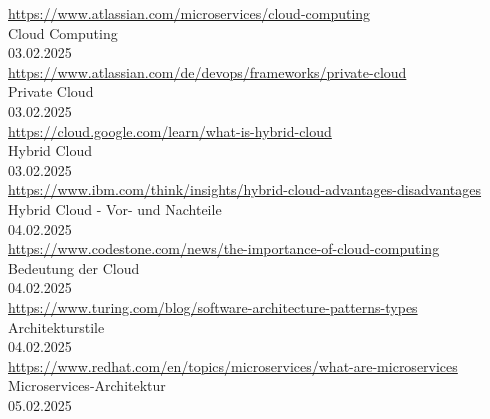 \begin{thebibliography}{999}
     \href{https://www.atlassian.com/microservices/cloud-computing}{https://www.atlassian.com/microservices/cloud-computing} \\
     Cloud Computing \\
     03.02.2025 \\

     \href{https://www.atlassian.com/de/devops/frameworks/private-cloud}{https://www.atlassian.com/de/devops/frameworks/private-cloud} \\
     Private Cloud \\
     03.02.2025 \\

     \href{https://cloud.google.com/learn/what-is-hybrid-cloud}{https://cloud.google.com/learn/what-is-hybrid-cloud} \\
     Hybrid Cloud \\
     03.02.2025 \\

     \href{https://www.ibm.com/think/insights/hybrid-cloud-advantages-disadvantages}{https://www.ibm.com/think/insights/hybrid-cloud-advantages-disadvantages} \\
     Hybrid Cloud - Vor- und Nachteile \\
     04.02.2025 \\

     \href{https://www.codestone.com/news/the-importance-of-cloud-computing}{https://www.codestone.com/news/the-importance-of-cloud-computing} \\
     Bedeutung der Cloud \\
     04.02.2025 \\

     \href{https://www.turing.com/blog/software-architecture-patterns-types}{https://www.turing.com/blog/software-architecture-patterns-types} \\
     Architekturstile \\
     04.02.2025 \\

     \href{https://www.redhat.com/en/topics/microservices/what-are-microservices}{https://www.redhat.com/en/topics/microservices/what-are-microservices} \\
     Microservices-Architektur \\
     05.02.2025 \\


\end{thebibliography}
